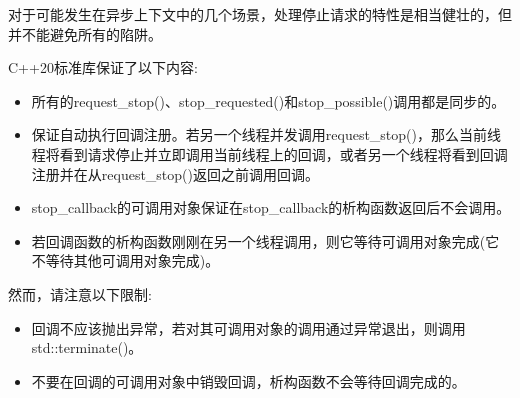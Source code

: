 
对于可能发生在异步上下文中的几个场景，处理停止请求的特性是相当健壮的，但并不能避免所有的陷阱。

C++20标准库保证了以下内容:

\begin{itemize}
\item 
所有的request\_stop()、stop\_requested()和stop\_possible()调用都是同步的。

\item 
保证自动执行回调注册。若另一个线程并发调用request\_stop()，那么当前线程将看到请求停止并立即调用当前线程上的回调，或者另一个线程将看到回调注册并在从request\_stop()返回之前调用回调。

\item 
stop\_callback的可调用对象保证在stop\_callback的析构函数返回后不会调用。

\item 
若回调函数的析构函数刚刚在另一个线程调用，则它等待可调用对象完成(它不等待其他可调用对象完成)。
\end{itemize}

然而，请注意以下限制:

\begin{itemize}
\item 
回调不应该抛出异常，若对其可调用对象的调用通过异常退出，则调用std::terminate()。

\item 
不要在回调的可调用对象中销毁回调，析构函数不会等待回调完成的。
\end{itemize}
